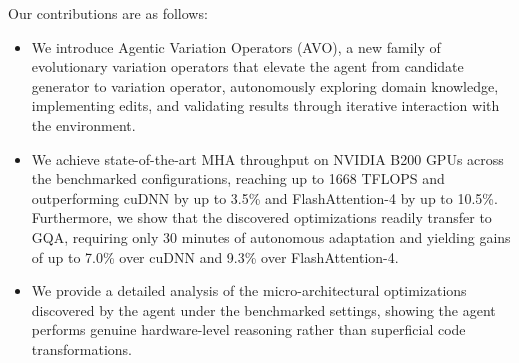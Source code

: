 Our contributions are as follows:
\begin{itemize}
    \item We introduce Agentic Variation Operators (AVO), a new family of evolutionary variation operators that elevate the agent from candidate generator to variation operator, autonomously exploring domain knowledge, implementing edits, and validating results through iterative interaction with the environment.
    \item We achieve state-of-the-art MHA throughput on NVIDIA B200 GPUs across the benchmarked configurations, reaching up to 1668 TFLOPS and outperforming cuDNN by up to 3.5\% and FlashAttention-4 by up to 10.5\%. Furthermore, we show that the discovered optimizations readily transfer to GQA, requiring only 30 minutes of autonomous adaptation and yielding gains of up to 7.0\% over cuDNN and 9.3\% over FlashAttention-4.
    \item We provide a detailed analysis of the micro-architectural optimizations discovered by the agent under the benchmarked settings, showing the agent performs genuine hardware-level reasoning rather than superficial code transformations.
\end{itemize}
